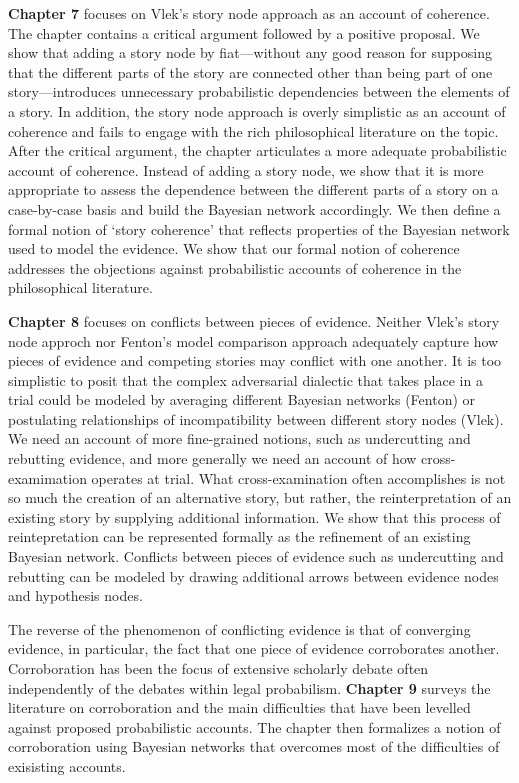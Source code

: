 \documentclass[
  10pt,
  dvipsnames,enabledeprecatedfontcommands]{scrartcl}
\begin{document}
\textbf{Chapter 7} focuses on Vlek's story node approach as an account
of coherence. The chapter contains a critical argument followed by a
positive proposal. We show that adding a story node by fiat---without
any good reason for supposing that the different parts of the story are
connected other than being part of one story---introduces unnecessary
probabilistic dependencies between the elements of a story. In addition,
the story node approach is overly simplistic as an account of coherence
and fails to engage with the rich philosophical literature on the topic.
After the critical argument, the chapter articulates a more adequate
probabilistic account of coherence.
 Instead of
adding a story node, we show that it is more appropriate to assess the
dependence between the different parts of a story on a case-by-case
basis and build the Bayesian network accordingly. We then define a
formal notion of `story coherence' that reflects properties of the
Bayesian network used to model the evidence. We show that our formal
notion of coherence addresses the objections against probabilistic
accounts of coherence in the philosophical literature.

\textbf{Chapter 8} focuses on conflicts between pieces of evidence.
Neither Vlek's story node approch nor Fenton's model comparison approach
adequately capture how pieces of evidence and competing stories may
conflict with one another. It is too simplistic to posit that the
complex adversarial dialectic that takes place in a trial could be
modeled by averaging different Bayesian networks (Fenton) or postulating
relationships of incompatibility between different story nodes (Vlek).
We need an account of more fine-grained notions, such as undercutting
and rebutting evidence, and more generally we need an account of how
cross-examimation operates at trial. What cross-examination often
accomplishes is not so much the creation of an alternative story, but
rather, the reinterpretation of an existing story by supplying
additional information. We show that this process of reintepretation can
be represented formally as the refinement of an existing Bayesian
network. Conflicts between pieces of evidence such as undercutting and
rebutting can be modeled by drawing additional arrows between evidence
nodes and hypothesis nodes.

The reverse of the phenomenon of conflicting evidence is that of
converging evidence, in particular, the fact that one piece of evidence
corroborates another. Corroboration has been the focus of extensive
scholarly debate often independently of the debates within legal
probabilism. \textbf{Chapter 9} surveys the literature on corroboration
and the main difficulties that have been levelled against proposed
probabilistic accounts. The chapter then formalizes a notion of
corroboration using Bayesian networks that overcomes most of the
difficulties of exisisting accounts.
\end{document}
